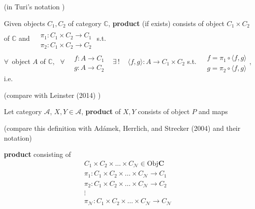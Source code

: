 \begin{definition}[Products]\label{agat:Def:Products}
	
	(in Turi's notation \cite{agat:Turi2001})
	
	Given objects $C_1,C_2$ of category $\mathbb{C}$, \textbf{product} (if exists) consists of object $C_1 \times C_2$ of $\mathbb{C}$ and $\begin{aligned} & \quad \\
	& \pi_1 : C_1 \times C_2 \to C_1 \\
	& \pi_2: C_1 \times C_2 \to C_2 \end{aligned}$ s.t. \\
	$\forall \, $ object $A$ of $\mathbb{C}$, \, $\forall \, \begin{aligned} & \quad \\
	& f : A \to C_1 \\
	& g : A \to C_2 \end{aligned}$ \quad \, $\exists \, ! \quad \, \langle f,g \rangle : A \to C_1 \times C_2$ s.t. $\begin{aligned} & \quad \\
	& f = \pi_1 \circ \langle f,g \rangle \\
	& g = \pi_2 \circ \langle f,g \rangle \end{aligned}$, i.e. 
	
	
	(compare with Leinster (2014) \cite{agat:Lein2014})
	
	Let category $\mathcal{A}$, $X,Y \in \mathcal{A}$, \textbf{product} of $X,Y$ consists of object $P$ and maps
	
	(compare this definition with Ad\'{a}mek, Herrlich, and Strecker (2004) \cite{agat:AHS2004} and their notation)
	
	\textbf{product} consisting of 
	\[
	\begin{aligned}
	C_1 \times C_2 \times \dots \times C_{\mathcal{N}} \in \text{Obj}\mathbf{C} \\
	\pi_1 : C_1 \times C_2 \times \dots \times C_{\mathcal{N}} \to C_1 \\ 
	\pi_2 : C_1 \times C_2 \times \dots \times C_{\mathcal{N}} \to C_2 \\ 
	\vdots \\
	\pi_{\mathcal{N}} : C_1 \times C_2 \times \dots \times C_{\mathcal{N}} \to C_{\mathcal{N}} \\ 
	\end{aligned}
	\]
	

\end{definition}
